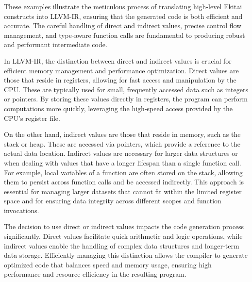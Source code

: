 \documentclass[
  oneside,
  english,
  coorientadorbanca,
  noabntexcite
]{ufsc-thesis-rn46-2019}
\begin{document}
These examples illustrate the meticulous process of translating high-level Ekitai constructs into LLVM-IR, ensuring that the generated code is both efficient and accurate.
The careful handling of direct and indirect values, precise control flow management, and type-aware function calls are fundamental to producing robust and performant intermediate code.

In LLVM-IR, the distinction between direct and indirect values is crucial for efficient memory management and performance optimization. Direct values are those that reside in registers, allowing for fast access and manipulation by the CPU. These are typically used for small, frequently accessed data such as integers or pointers. By storing these values directly in registers, the program can perform computations more quickly, leveraging the high-speed access provided by the CPU's register file.

On the other hand, indirect values are those that reside in memory, such as the stack or heap. These are accessed via pointers, which provide a reference to the actual data location. Indirect values are necessary for larger data structures or when dealing with values that have a longer lifespan than a single function call. For example, local variables of a function are often stored on the stack, allowing them to persist across function calls and be accessed indirectly. This approach is essential for managing larger datasets that cannot fit within the limited register space and for ensuring data integrity across different scopes and function invocations.

The decision to use direct or indirect values impacts the code generation process significantly. Direct values facilitate quick arithmetic and logic operations, while indirect values enable the handling of complex data structures and longer-term data storage. Efficiently managing this distinction allows the compiler to generate optimized code that balances speed and memory usage, ensuring high performance and resource efficiency in the resulting program.
\end{document}
